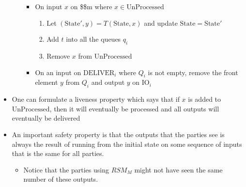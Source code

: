 \documentclass[11pt]{article}
\begin{document}
\begin{itemize}
\begin{itemize}
\begin{itemize}
\item On input \(x\) on \$\$m where \(x \in \text{UnProcessed}\)
\begin{enumerate}
\item Let \((\text{State}', y)=T(\text{State},x)\) and update \(\text{State}= \text{State}'\)
\item Add \(t\) into all the queues \(q_i\)
\item Remove \(x\) from \(\text{UnProcessed}\)
\end{enumerate}
\item On an input on \(\text{DELIVER}_i\) where \(Q_i\) is not empty, remove the front element \(y\) from \(Q_i\) and output \(y\) on \(\text{IO}_i\)
\end{itemize}
\end{itemize}

\item One can formulate a liveness property which says that if \(x\) is added to \(\text{UnProcessed}\), then it will eventually be processed and all outputs will eventually be delivered

\item An important safety property is that the outputs that the parties see is always the result of running from the initial state on some sequence of inputs that is the same for all parties. 
\begin{itemize}
\item Notice that the parties using \(RSM_M\) might not have seen the same number of these outputs.
\end{itemize}
\end{itemize}
\end{document}

